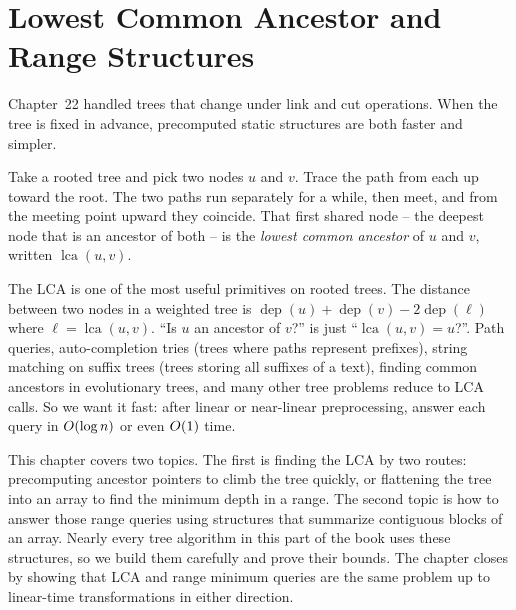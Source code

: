 \chapter{Lowest Common Ancestor and Range Structures}

\newcommand{\dep}{\operatorname{dep}}
\newcommand{\pa}{\operatorname{par}}
\newcommand{\up}{\mathrm{up}}
\newcommand{\spt}{\mathrm{sp}}
\newcommand{\eu}{\mathrm{E}}
\newcommand{\de}{\mathrm{H}}
\newcommand{\fst}{\mathrm{first}}
\newcommand{\lz}{\mathrm{lazy}}
\providecommand{\lowbit}{\operatorname{lowbit}}

Chapter~22 handled trees that change under link and cut operations. When the tree is fixed in advance, precomputed static structures are both faster and simpler.

Take a rooted tree and pick two nodes $u$ and $v$. Trace the path from each up toward the root. The two paths run separately for a
while, then meet, and from the meeting point upward they coincide. That first shared node --
the deepest node that is an ancestor of both -- is the \emph{lowest common ancestor} of $u$
and $v$, written $\operatorname{lca}(u,v)$.

The LCA is one of the most useful primitives on rooted trees. The distance between two nodes
in a weighted tree is $\dep(u)+\dep(v)-2\dep(\ell)$ where $\ell=\operatorname{lca}(u,v)$.
``Is $u$ an ancestor of $v$?'' is just ``$\operatorname{lca}(u,v)=u$?''. Path queries, auto-completion tries (trees where paths represent prefixes), string matching on suffix trees (trees storing all suffixes of a text), finding common ancestors in evolutionary trees, and many other tree problems reduce to LCA calls. So we want it fast: after linear or near-linear preprocessing, answer each query in $O(\log n)$ or even $O(1)$ time.

This chapter covers two topics. The first is finding the LCA by two routes: precomputing ancestor pointers to climb the tree quickly, or flattening the tree into an array to find the minimum depth in a range. The second topic is how to answer those range queries using structures that summarize contiguous blocks of an array. Nearly every tree algorithm in this part of the book uses these structures, so we build them carefully and prove their bounds. The chapter closes by showing that LCA and range minimum queries are the same problem up to linear-time transformations in either direction.

